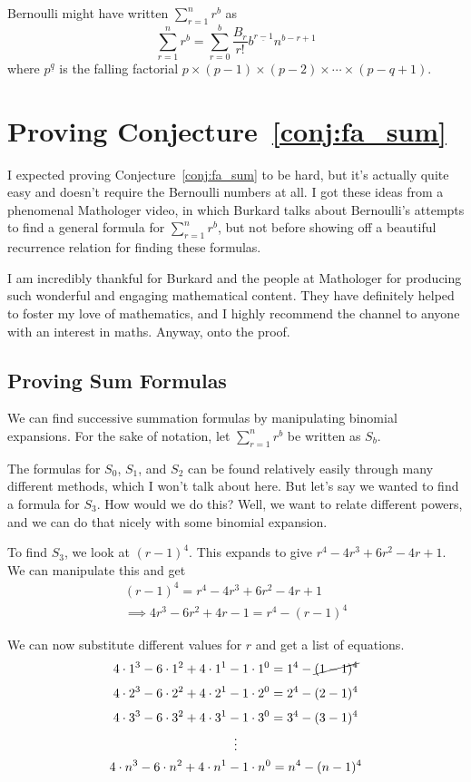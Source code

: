 \documentclass[a4paper]{article}
\newcommand{\sn}{\sum\limits_{r=1}^{n}}
\begin{document}
Bernoulli might have written $\sn r^b$ as $$\sn r^b = \sum_{r=0}^b \frac{B_r}{r!} b^{\underline{r-1}} n^{b-r+1}$$ where $p^{\underline{q}}$ is the falling factorial $p \times (p-1) \times (p-2) \times \cdots \times (p-q+1)$.

\section{Proving Conjecture~\ref{conj:fa_sum}}

I expected proving Conjecture~\ref{conj:fa_sum} to be hard, but it's actually quite easy and doesn't require the Bernoulli numbers at all. I got these ideas from a phenomenal Mathologer video\cite{mathologer-power-sums}, in which Burkard talks about Bernoulli's attempts to find a general formula for $\sn r^b$, but not before showing off a beautiful recurrence relation for finding these formulas.

I am incredibly thankful for Burkard and the people at Mathologer for producing such wonderful and engaging mathematical content. They have definitely helped to foster my love of mathematics, and I highly recommend the channel to anyone with an interest in maths. Anyway, onto the proof.

\subsection{Proving Sum Formulas}

We can find successive summation formulas by manipulating binomial expansions. For the sake of notation, let $\sn r^b$ be written as $S_b$.

The formulas for $S_0$, $S_1$, and $S_2$ can be found relatively easily through many different methods, which I won't talk about here. But let's say we wanted to find a formula for $S_3$. How would we do this? Well, we want to relate different powers, and we can do that nicely with some binomial expansion.

To find $S_3$, we look at $(r-1)^4$. This expands to give $r^4 - 4r^3 + 6r^2 - 4r + 1$. We can manipulate this and get
\begin{gather*}
(r-1)^4 = r^4 - 4r^3 + 6r^2 - 4r + 1\\[0.5em]
\implies 4r^3 - 6r^2 + 4r - 1 = r^4 - (r-1)^4
\end{gather*}

We can now substitute different values for $r$ and get a list of equations.
\begin{gather*}
4 \cdot 1^3 - 6 \cdot 1^2 + 4 \cdot 1^1 - 1 \cdot 1^0 = 1^4 - \cancel{(1-1)^4}\\[0.3em]
4 \cdot 2^3 - 6 \cdot 2^2 + 4 \cdot 2^1 - 1 \cdot 2^0 = 2^4 - (2-1)^4\\[0.3em]
4 \cdot 3^3 - 6 \cdot 3^2 + 4 \cdot 3^1 - 1 \cdot 3^0 = 3^4 - (3-1)^4\\
\vdots\\
4 \cdot n^3 - 6 \cdot n^2 + 4 \cdot n^1 - 1 \cdot n^0 = n^4 - (n-1)^4
\end{gather*}
\end{document}
